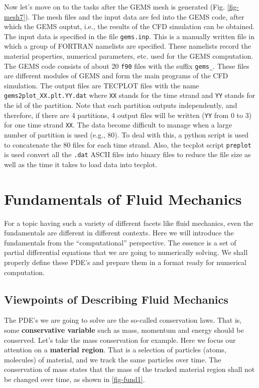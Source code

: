 \documentclass[12pt, letterpaper]{report}
\begin{document}
Now let's move on to the tasks after the GEMS mesh is generated (Fig. \ref{fig-mesh7}). The mesh
files and the input data are fed into the GEMS code, after which the GEMS ouptut, i.e., the results
of the CFD simulation can be obtained. The input data is specified in the file \verb+gems.inp+. This
is a manually written file in which a group of FORTRAN namelists are specified. These namelists
record the material properties, numerical parameters, etc. used for the GEMS computation. The GEMS
code consists of about 20 \verb+f90+ files with the suffix \verb+gems_+. These files are different
modules of GEMS and form the main programs of the CFD simulation. The output files are TECPLOT files
with the name \verb+gems2plot_XX.plt.YY.dat+ where \verb+XX+ stands for the time strand and
\verb+YY+ stands for the id of the partition. Note that each partition outputs independently, and
therefore, if there are 4 partitions, 4 output files will be written (\verb+YY+ from 0 to 3) for one
time strand \verb+XX+. The data become difficult to manage when a large number of partition is used
(e.g., 80). To deal with this, a python script is used to concatenate the 80 files for each time
strand. Also, the tecplot script \verb+preplot+ is used convert all the \verb+.dat+ ASCII files into
binary files to reduce the file size as well as the time it takes to load data into tecplot.

\chapter{Fundamentals of Fluid Mechanics}\label{c2}

For a topic having such a variety of different facets like fluid mechanics, even the fundamentals
are different in different contexts. Here we will introduce the fundamentals from the
``computational'' perspective. The essence is a set of partial differential equations that we are
going to numerically solving. We shall properly define these PDE's and prepare them in a format ready
for numerical computation. 
\paraspace

\section{Viewpoints of Describing Fluid Mechanics}

The PDE's we are going to solve are the so-called conservation laws. That is, some {\bf conservative
variable} such as mass, momentum and energy should be conserved. Let's take the mass
conservation for example. Here we focus our attention on a {\bf material region}. That is a
selection of particles (atoms, molecules) of material, and we track the same particles over time.
The conservation of mass states that the mass of the tracked material region shall not be changed
over time, as shown in \ref{fig-fund1}.
\end{document}
